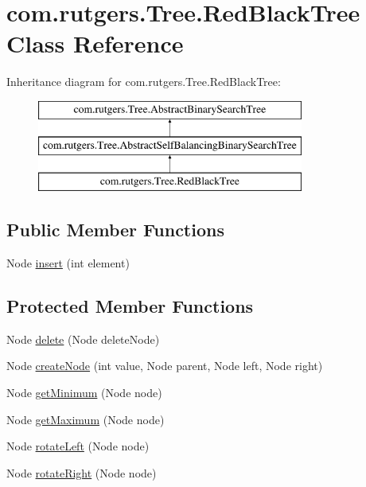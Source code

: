 \hypertarget{classcom_1_1rutgers_1_1Tree_1_1RedBlackTree}{}\section{com.\+rutgers.\+Tree.\+Red\+Black\+Tree Class Reference}
\label{classcom_1_1rutgers_1_1Tree_1_1RedBlackTree}
Inheritance diagram for com.\+rutgers.\+Tree.\+Red\+Black\+Tree\+:\begin{figure}[H]
\begin{center}
\leavevmode
\includegraphics[height=3.000000cm]{classcom_1_1rutgers_1_1Tree_1_1RedBlackTree}
\end{center}
\end{figure}
\subsection*{Public Member Functions}
\begin{DoxyCompactItemize}
\item 
Node \hyperlink{classcom_1_1rutgers_1_1Tree_1_1RedBlackTree_a7677220dd9ac20292cbabb0c80d4ce3d}{insert} (int element)
\end{DoxyCompactItemize}
\subsection*{Protected Member Functions}
\begin{DoxyCompactItemize}
\item 
Node \hyperlink{classcom_1_1rutgers_1_1Tree_1_1RedBlackTree_a32edb63c284dad19e7feb2c8ae61366d}{delete} (Node delete\+Node)
\item 
Node \hyperlink{classcom_1_1rutgers_1_1Tree_1_1RedBlackTree_a44da4e60e7dafdf6e5d290be07ee4c8a}{create\+Node} (int value, Node parent, Node left, Node right)
\item 
Node \hyperlink{classcom_1_1rutgers_1_1Tree_1_1RedBlackTree_aa568e5fd51bd7b1b08fb52f5eaf4ba25}{get\+Minimum} (Node node)
\item 
Node \hyperlink{classcom_1_1rutgers_1_1Tree_1_1RedBlackTree_a2fc7ea91e9e22df233f8abe9acada0c1}{get\+Maximum} (Node node)
\item 
Node \hyperlink{classcom_1_1rutgers_1_1Tree_1_1RedBlackTree_a5265e4d750913f992eec7cec4b1082bf}{rotate\+Left} (Node node)
\item 
Node \hyperlink{classcom_1_1rutgers_1_1Tree_1_1RedBlackTree_a78a3a6b0847ca0f071dabf45bef4f924}{rotate\+Right} (Node node)
\end{DoxyCompactItemize}
